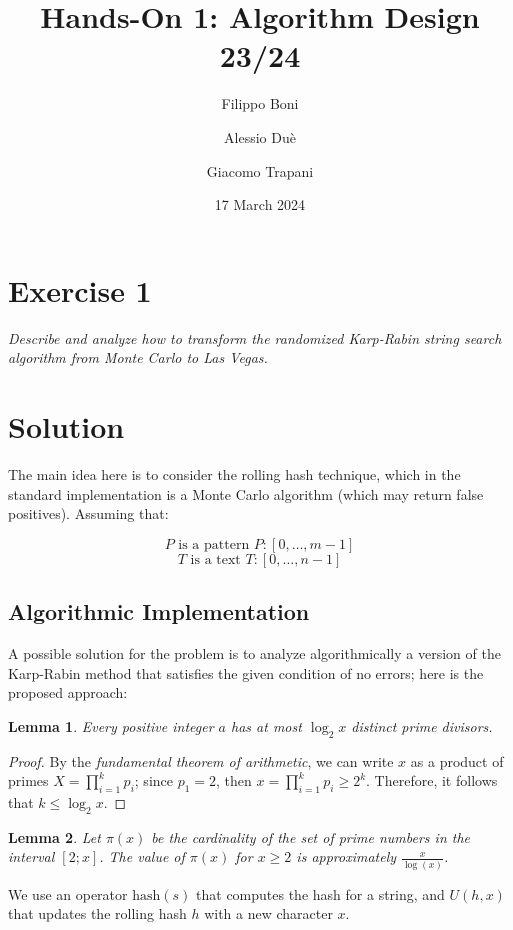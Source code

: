 \documentclass[a4paper, 12pt]{article}
\title{Hands-On 1: Algorithm Design 23/24}
\date{17 March 2024}
\author{Filippo Boni \and Alessio Duè \and Giacomo Trapani}
\newtheorem{lemma}{Lemma}
\begin{document}
\maketitle

\section{Exercise 1}
{
\itshape{Describe and analyze how to transform the randomized Karp-Rabin string search algorithm from Monte Carlo to Las Vegas}.
}
\section*{Solution}

The main idea here is to consider the rolling hash technique, which in the standard implementation is a Monte Carlo algorithm (which may return false positives). Assuming that:

\[P \text{ is a pattern } P:[0, \dots, m-1]\]
\[T \text{ is a text } T:[0, \dots, n-1]\]

\subsection{Algorithmic Implementation}
A possible solution for the problem is to analyze algorithmically a version of the Karp-Rabin method that satisfies the given condition of no errors; here is the proposed approach:

\begin{lemma}
  Every positive integer \( a \) has at most \( \log_2 x \) distinct prime divisors.
\end{lemma}

\begin{proof}
  By the \textit{fundamental theorem of arithmetic}, we can write \( x \) as a product of primes \( X = \prod_{i=1}^{k} p_i \); since \( p_1 = 2 \), then \( x = \prod_{i=1}^{k} p_i \geq 2^k \). Therefore, it follows that \( k \leq \log_2 x \).
\end{proof}

\begin{lemma}
  Let \( \pi(x) \) be the cardinality of the set of prime numbers in the interval \([2;x]\). The value of \( \pi(x) \) for \( x \geq 2 \) is approximately \( \frac{x}{\log(x)} \).
\end{lemma}

\noindent
We use an operator \(\mathrm{hash}(s)\) that computes the hash for a string, and \(U(h, x)\) that updates the rolling hash \(h\) with a new character \(x\).
\end{document}
